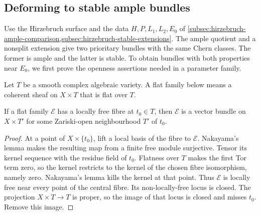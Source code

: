 \subsection{Deforming to stable ample bundles}
\label{subsec:hirzebruch-stable-ample-deformations}

Use the Hirzebruch surface and the data $H,P,L_1,L_2,E_0$ of
\cref{subsec:hirzebruch-ample-comparison,subsec:hirzebruch-stable-extensions}.
The ample quotient and a nonsplit extension give two prioritary bundles
with the same Chern classes. The former is ample and the latter is stable.
To obtain bundles with both properties near $E_0$, we first prove the
openness assertions needed in a parameter family.

Let $T$ be a smooth complex algebraic variety. A flat family below means
a coherent sheaf on $X\times T$ that is flat over $T$.

\begin{lemma}\label{lem:hirzebruch-family-local-freeness}
If a flat family $\mathcal E$ has a locally free fibre at $t_0\in T$,
then $\mathcal E$ is a vector bundle on $X\times T'$ for some Zariski-open
neighbourhood $T'$ of $t_0$.
\end{lemma}
\begin{proof}
At a point of $X\times\{t_0\}$, lift a local basis of the fibre to
$\mathcal E$. Nakayama's lemma makes the resulting map from a finite
free module surjective. Tensor its kernel sequence with the residue field
of $t_0$. Flatness over $T$ makes the first Tor term zero, so the kernel
restricts to the kernel of the chosen fibre isomorphism, namely zero.
Nakayama's lemma kills the kernel at that point. Thus $\mathcal E$ is
locally free near every point of the central fibre. Its non-locally-free
locus is closed. The projection $X\times T\to T$ is proper, so the image
of that locus is closed and misses $t_0$. Remove this image.
\end{proof}

